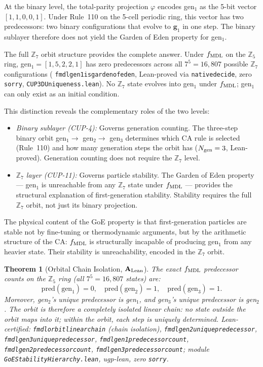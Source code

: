 \documentclass[11pt]{article}
\newtheorem{theorem}{Theorem}[section]
\theoremstyle{remark}
\newcommand{\lean}[1]{%
  \penalty-100
  \begingroup\def\_{\textunderscore\allowbreak}\texttt{#1}\endgroup}
\newcommand{\CatAL}{\ensuremath{\textbf{A}_{\rm Lean}}}
\begin{document}
At the binary level, the total-parity projection $\varphi$ encodes gen$_1$ as the
5-bit vector $[1,1,0,0,1]$. Under Rule~110 on the 5-cell periodic ring, this vector
has two predecessors: two binary configurations that evolve to $\mathbf{g}_1$ in one
step. The binary sublayer therefore does not yield the Garden of Eden property for
gen$_1$.

The full $\mathbb{Z}_7$ orbit structure provides the complete answer. Under $f_{\rm MDL}$
on the $\mathbb{Z}_5$ ring, gen$_1 = [1,5,2,2,1]$ has zero predecessors across all
$7^5 = 16{,}807$ possible $\mathbb{Z}_7$ configurations
(\lean{fmdl\_gen1\_is\_garden\_of\_eden}, Lean-proved via \lean{native\_decide}, zero
\texttt{sorry}, \lean{CUP3DUniqueness.lean}). No $\mathbb{Z}_7$ state evolves into
gen$_1$ under $f_{\rm MDL}$; gen$_1$ can only exist as an initial condition.

This distinction reveals the complementary roles of the two levels:
\begin{itemize}
\item \emph{Binary sublayer (CUP-4):} Governs generation counting. The three-step binary
  orbit gen$_1 \to$ gen$_2 \to$ gen$_3$ determines which CA rule is selected
  (Rule~110) and how many generation steps the orbit has ($N_{\rm gen} = 3$,
  Lean-proved). Generation counting does not require the $\mathbb{Z}_7$ level.
\item \emph{$\mathbb{Z}_7$ layer (CUP-11):} Governs particle stability. The Garden of
  Eden property --- gen$_1$ is unreachable from any $\mathbb{Z}_7$ state under
  $f_{\rm MDL}$ --- provides the structural explanation of first-generation stability.
  Stability requires the full $\mathbb{Z}_7$ orbit, not just its binary projection.
\end{itemize}

The physical content of the GoE property is that first-generation particles are stable
not by fine-tuning or thermodynamic arguments, but by the arithmetic structure of the
CA: $f_{\rm MDL}$ is structurally incapable of producing gen$_1$ from any heavier state.
Their stability is unreachability, encoded in the $\mathbb{Z}_7$ orbit.

\begin{theorem}[Orbital Chain Isolation, $\CatAL$]
\label{thm:orbital_chain}
The exact $f_{\rm MDL}$ predecessor counts on the $\mathbb{Z}_5$ ring (all $7^5 = 16{,}807$ states) are:
\[
\mathrm{pred}(\mathrm{gen}_1) = 0, \quad
\mathrm{pred}(\mathrm{gen}_2) = 1, \quad
\mathrm{pred}(\mathrm{gen}_3) = 1.
\]
Moreover, gen$_2$'s unique predecessor is gen$_1$, and gen$_3$'s unique predecessor is gen$_2$.
The orbit is therefore a \emph{completely isolated linear chain}:
no state outside the orbit maps into it; within the orbit, each step is uniquely determined.
Lean-certified: \lean{fmdl\_orbit\_linear\_chain} (chain isolation),
\lean{fmdl\_gen2\_unique\_predecessor}, \lean{fmdl\_gen3\_unique\_predecessor},
\lean{fmdl\_gen1\_predecessor\_count}, \lean{fmdl\_gen2\_predecessor\_count},
\lean{fmdl\_gen3\_predecessor\_count};
module \lean{GoEStability\-Hierarchy.lean}, ugp-lean,
zero \texttt{sorry}.
\end{theorem}
\end{document}
